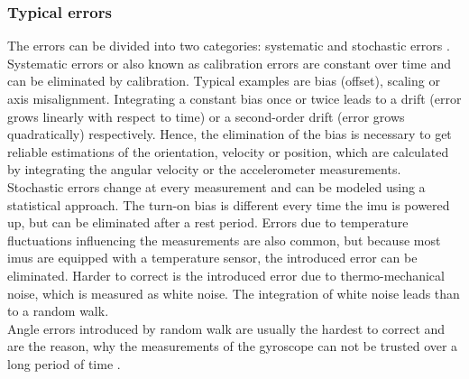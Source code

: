 \subsubsection{Typical  errors}
\label{sse:mems_errors}
The errors can be divided into two categories: systematic and stochastic errors \cite{Zhang2019}.\\
Systematic errors or also known as calibration errors are constant over time and can be eliminated by calibration.
Typical examples are bias (offset), scaling or axis misalignment.
Integrating a constant bias once or twice leads to a drift (error grows linearly with respect to time) or a second-order drift (error grows quadratically) respectively.
Hence, the elimination of the bias is necessary to get reliable estimations of the orientation, velocity or position, which are calculated by integrating the angular velocity or the accelerometer measurements.\\
Stochastic errors change at every measurement and can be modeled using a statistical approach.
The turn-on bias is different every time the \gls{imu} is powered up, but can be eliminated after a rest period.
Errors due to temperature fluctuations influencing the measurements are also common, but because most \glspl{imu} are equipped with a temperature sensor, the introduced error can be eliminated.
Harder to correct is the introduced error due to thermo-mechanical noise, which is measured as white noise.
The integration of white noise leads than to a random walk.\\
Angle errors introduced by random walk are usually the hardest to correct and are the reason, why the measurements of the gyroscope can not be trusted over a long period of time \cite{Woodman2007}.


